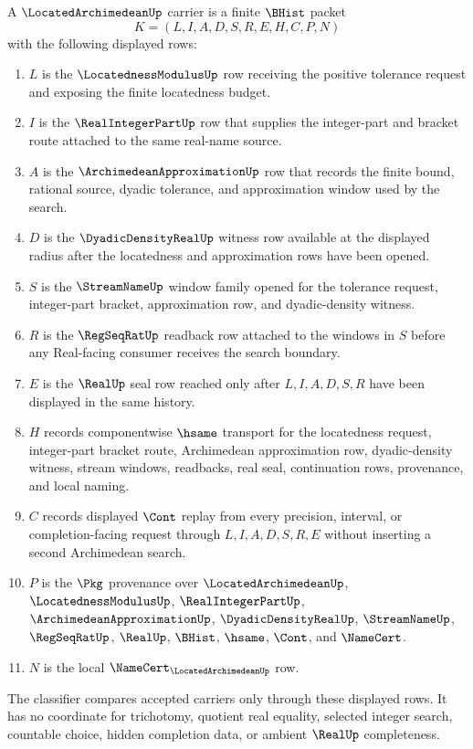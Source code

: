 \begin{definition}
\label{def:located-archimedean-carrier}
A $\LocatedArchimedeanUp$ carrier is a finite $\BHist$ packet
$$
K=(L,I,A,D,S,R,E,H,C,P,N)
$$
with the following displayed rows:
\begin{enumerate}
\item $L$ is the $\LocatednessModulusUp$ row receiving the positive tolerance request and exposing the finite locatedness budget.
\item $I$ is the $\RealIntegerPartUp$ row that supplies the integer-part and bracket route attached to the same real-name source.
\item $A$ is the $\ArchimedeanApproximationUp$ row that records the finite bound, rational source, dyadic tolerance, and approximation window used by the search.
\item $D$ is the $\DyadicDensityRealUp$ witness row available at the displayed radius after the locatedness and approximation rows have been opened.
\item $S$ is the $\StreamNameUp$ window family opened for the tolerance request, integer-part bracket, approximation row, and dyadic-density witness.
\item $R$ is the $\RegSeqRatUp$ readback row attached to the windows in $S$ before any Real-facing consumer receives the search boundary.
\item $E$ is the $\RealUp$ seal row reached only after $L,I,A,D,S,R$ have been displayed in the same history.
\item $H$ records componentwise $\hsame$ transport for the locatedness request, integer-part bracket route, Archimedean approximation row, dyadic-density witness, stream windows, readbacks, real seal, continuation rows, provenance, and local naming.
\item $C$ records displayed $\Cont$ replay from every precision, interval, or completion-facing request through $L,I,A,D,S,R,E$ without inserting a second Archimedean search.
\item $P$ is the $\Pkg$ provenance over $\LocatedArchimedeanUp$, $\LocatednessModulusUp$, $\RealIntegerPartUp$, $\ArchimedeanApproximationUp$, $\DyadicDensityRealUp$, $\StreamNameUp$, $\RegSeqRatUp$, $\RealUp$, $\BHist$, $\hsame$, $\Cont$, and $\NameCert$.
\item $N$ is the local $\NameCert_{\LocatedArchimedeanUp}$ row.
\end{enumerate}
The classifier compares accepted carriers only through these displayed rows. It has no coordinate for trichotomy, quotient real equality, selected integer search, countable choice, hidden completion data, or ambient $\RealUp$ completeness.
\end{definition}

